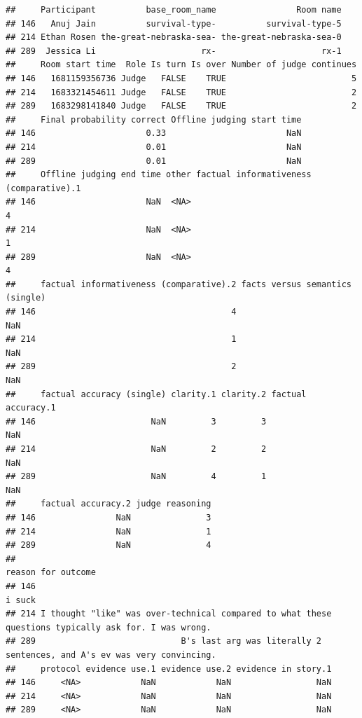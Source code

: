 \documentclass[
]{article}
\begin{document}
\begin{verbatim}
##     Participant          base_room_name                Room name
## 146   Anuj Jain          survival-type-          survival-type-5
## 214 Ethan Rosen the-great-nebraska-sea- the-great-nebraska-sea-0
## 289  Jessica Li                     rx-                     rx-1
##     Room start time  Role Is turn Is over Number of judge continues
## 146   1681159356736 Judge   FALSE    TRUE                         5
## 214   1683321454611 Judge   FALSE    TRUE                         2
## 289   1683298141840 Judge   FALSE    TRUE                         2
##     Final probability correct Offline judging start time
## 146                      0.33                        NaN
## 214                      0.01                        NaN
## 289                      0.01                        NaN
##     Offline judging end time other factual informativeness (comparative).1
## 146                      NaN  <NA>                                       4
## 214                      NaN  <NA>                                       1
## 289                      NaN  <NA>                                       4
##     factual informativeness (comparative).2 facts versus semantics (single)
## 146                                       4                             NaN
## 214                                       1                             NaN
## 289                                       2                             NaN
##     factual accuracy (single) clarity.1 clarity.2 factual accuracy.1
## 146                       NaN         3         3                NaN
## 214                       NaN         2         2                NaN
## 289                       NaN         4         1                NaN
##     factual accuracy.2 judge reasoning
## 146                NaN               3
## 214                NaN               1
## 289                NaN               4
##                                                                                       reason for outcome
## 146                                                                                               i suck
## 214 I thought "like" was over-technical compared to what these questions typically ask for. I was wrong.
## 289                             B's last arg was literally 2 sentences, and A's ev was very convincing. 
##     protocol evidence use.1 evidence use.2 evidence in story.1
## 146     <NA>            NaN            NaN                 NaN
## 214     <NA>            NaN            NaN                 NaN
## 289     <NA>            NaN            NaN                 NaN

\end{verbatim}
\end{document}
